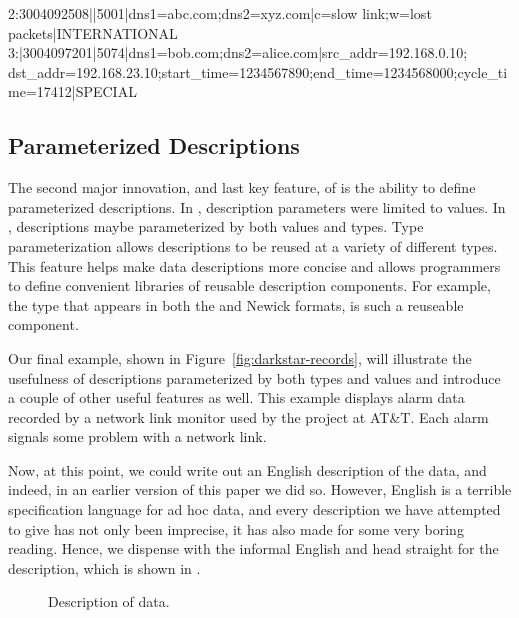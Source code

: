 \begin{figure*}
  \centering
\begin{code}\scriptsize
 2:3004092508||5001|dns1=abc.com;dns2=xyz.com|c=slow link;w=lost packets|INTERNATIONAL
 3:|3004097201|5074|dns1=bob.com;dns2=alice.com|src_addr=192.168.0.10;
 dst_addr=192.168.23.10;start_time=1234567890;end_time=1234568000;cycle_time=17412|SPECIAL
\end{code}  
  \caption{Simplified network monitoring data.  This 
data containts two alarm records.  Extra newlines 
were inserted mid-record so the data would fit on a page.}
  \label{fig:darkstar-records}
\end{figure*}

\subsection{Parameterized Descriptions}

The second major innovation, and last key feature, of \padsml{} is the
ability to define parameterized descriptions.  In \pads, description
parameters were limited to values.  In \padsml, descriptions maybe
parameterized by both values and types.  Type parameterization allows
descriptions to be reused at a variety of different types.  This
feature helps make data descriptions more concise and allows
programmers to define convenient libraries of reusable description
components. For example, the  type that appears in both the
\dibbler{} and Newick formats, is such a reuseable component.

Our final example, shown in Figure~\ref{fig:darkstar-records}, will
illustrate the usefulness of descriptions parameterized by both types
and values and introduce a couple of other useful features as well.
This example displays alarm data recorded by a network link monitor
used by the \darkstar{} project at AT\&T.  Each alarm signals some
problem with a network link.

Now, at this point, we could write out an English description
of the \darkstar{} data, and indeed, in an earlier version of this paper
we did so.  However, English is a terrible specification language
for ad hoc data, and every description we have attempted to give has not 
only been imprecise, it has also made for some very 
boring reading.  Hence, we dispense with the informal
English and head straight for the \padsml{} description,
which is shown in .

\begin{figure}
  \centering
  
  \caption{Description of \darkstar{} data.}
  \label{fig:darkstar-ml}
\end{figure}

